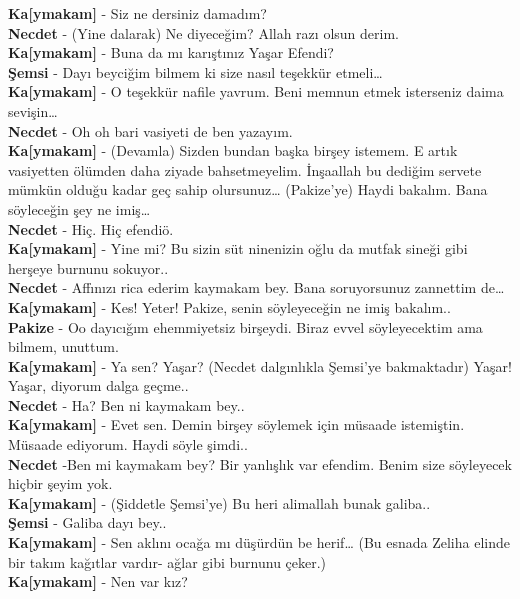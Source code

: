 \documentclass[]{book}
\begin{document}
\textbf{Ka{[}ymakam{]}} - Siz ne dersiniz damadım?\\
\textbf{Necdet} - (Yine dalarak) Ne diyeceğim? Allah razı olsun derim.\\
\textbf{Ka{[}ymakam{]}} - Buna da mı karıştınız Yaşar Efendi?\\
\textbf{Şemsi} - Dayı beyciğim bilmem ki size nasıl teşekkür etmeli\ldots{}\\
\textbf{Ka{[}ymakam{]}} - O teşekkür nafile yavrum. Beni memnun etmek isterseniz daima sevişin\ldots{}\\
\textbf{Necdet} - Oh oh bari vasiyeti de ben yazayım.\\
\textbf{Ka{[}ymakam{]}} - (Devamla) Sizden bundan başka birşey istemem. E artık vasiyetten ölümden daha ziyade bahsetmeyelim. İnşaallah bu dediğim servete mümkün olduğu kadar geç sahip olursunuz\ldots{} (Pakize'ye) Haydi bakalım. Bana söyleceğin şey ne imiş\ldots{}\\
\textbf{Necdet} - Hiç. Hiç efendiö.\\
\textbf{Ka{[}ymakam{]}} - Yine mi? Bu sizin süt ninenizin oğlu da mutfak sineği gibi herşeye burnunu sokuyor..\\
\textbf{Necdet} - Affınızı rica ederim kaymakam bey. Bana soruyorsunuz zannettim de\ldots{}\\
\textbf{Ka{[}ymakam{]}} - Kes! Yeter! Pakize, senin söyleyeceğin ne imiş bakalım..\\
\textbf{Pakize} - Oo dayıcığım ehemmiyetsiz birşeydi. Biraz evvel söyleyecektim ama bilmem, unuttum.\\
\textbf{Ka{[}ymakam{]}} - Ya sen? Yaşar? (Necdet dalgınlıkla Şemsi'ye bakmaktadır) Yaşar! Yaşar, diyorum dalga geçme..\\
\textbf{Necdet} - Ha? Ben ni kaymakam bey..\\
\textbf{Ka{[}ymakam{]}} - Evet sen. Demin birşey söylemek için müsaade istemiştin. Müsaade ediyorum. Haydi söyle şimdi..\\
\textbf{Necdet} -Ben mi kaymakam bey? Bir yanlışlık var efendim. Benim size söyleyecek hiçbir şeyim yok.\\
\textbf{Ka{[}ymakam{]}} - (Şiddetle Şemsi'ye) Bu heri alimallah bunak galiba..\\
\textbf{Şemsi} - Galiba dayı bey..\\
\textbf{Ka{[}ymakam{]}} - Sen aklını ocağa mı düşürdün be herif\ldots{} (Bu esnada Zeliha elinde bir takım kağıtlar vardır- ağlar gibi burnunu çeker.)\\
\textbf{Ka{[}ymakam{]}} - Nen var kız?\\
\end{document}
